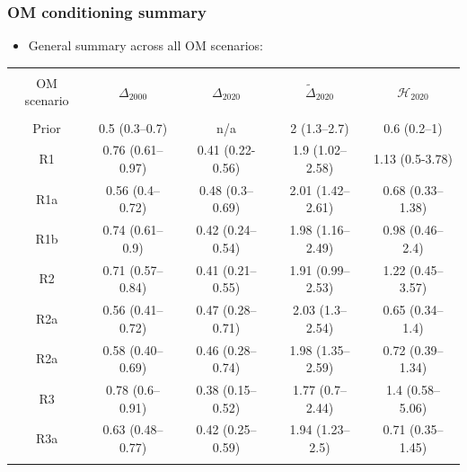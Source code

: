 \documentclass{beamer}
\newcommand{\tdel}{\tilde\Delta}
\begin{document}
\begin{frame}
    \frametitle{OM conditioning summary}
\begin{itemize}
    \item General summary across all OM scenarios:
\end{itemize}
    \tiny{
\begin{table}
    \begin{center}
        \begin{tabular}{|ccccc|}
            \hline
            & & & & \\
            OM scenario & $\Delta_{2000}$ & $\Delta_{2020}$ & $\tdel_{2020}$ & $\mathcal{H}_{2020}$\\
            & & & & \\
Prior & 0.5 (0.3–0.7)    & n/a              & 2 (1.3–2.7)      & 0.6 (0.2–1) \\
R1    & 0.76 (0.61–0.97) & 0.41 (0.22-0.56) & 1.9 (1.02–2.58)  & 1.13 (0.5-3.78) \\
R1a   & 0.56 (0.4–0.72)  & 0.48 (0.3–0.69)  & 2.01 (1.42–2.61) & 0.68 (0.33–1.38) \\
R1b   & 0.74 (0.61–0.9)  & 0.42 (0.24–0.54) & 1.98 (1.16–2.49) & 0.98 (0.46–2.4) \\
R2    & 0.71 (0.57–0.84) & 0.41 (0.21–0.55) & 1.91 (0.99–2.53) & 1.22 (0.45–3.57) \\
R2a   & 0.56 (0.41–0.72) & 0.47 (0.28–0.71) & 2.03 (1.3–2.54)  & 0.65 (0.34–1.4) \\
R2a   & 0.58 (0.40–0.69) & 0.46 (0.28–0.74) & 1.98 (1.35–2.59)  & 0.72 (0.39–1.34) \\
R3    & 0.78 (0.6–0.91)  & 0.38 (0.15–0.52) & 1.77 (0.7–2.44)  & 1.4 (0.58–5.06) \\
R3a   & 0.63 (0.48–0.77) & 0.42 (0.25–0.59) & 1.94 (1.23–2.5)  & 0.71 (0.35–1.45) \\
            & & & & \\
            \hline
        \end{tabular}
    \end{center}
\end{table}
}
\end{frame}
\end{document}
